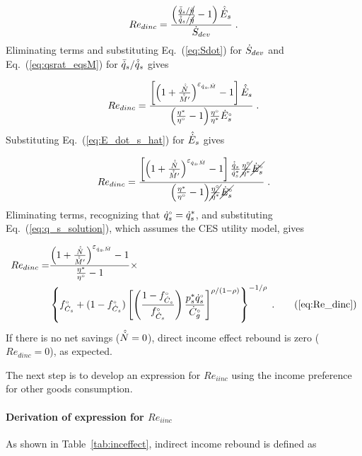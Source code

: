 \begin{equation}
  Re_{dinc} = \frac{\left( \frac{\bar{\dot{q}}_s / \cancel{\bar{\eta}}}{\hat{\dot{q}}_s / \cancel{\hat{\eta}}} - 1  \right) \hat{\dot{E}}_s}
              {\dot{S}_{dev}} \; .
\end{equation}
%
Eliminating terms and substituting Eq.~(\ref{eq:Sdot}) for $\dot{S}_{dev}$ and
Eq.~(\ref{eq:qsrat_eqsM}) for $\bar{\dot{q}}_s / \hat{\dot{q}}_s$ gives

\begin{equation}
  Re_{dinc} = \frac{\left[ \left( 1 + \frac{\hat{\dot{N}}}{\hat{\dot{M}}^\prime} \right) ^{\varepsilon_{\dot{q}_s\!,\dot{M}}} - 1  \right] \hat{\dot{E}}_s}
              {\left( \frac{{\eta}^*}{{}{\eta}^{\scriptscriptstyle \circ}} - 1 \right)\! \frac{{}{\eta}^{\scriptscriptstyle \circ}}{{\eta}^*} {}{\dot{E}}^{\scriptscriptstyle \circ}_s} \; .
\end{equation}
%
Substituting Eq.~(\ref{eq:E_dot_s_hat}) for $\hat{\dot{E}}_s$ gives

\begin{equation}
  Re_{dinc} = \frac{\left[ \left( 1 + \frac{\hat{\dot{N}}}{\hat{\dot{M}}^\prime} \right) ^{\varepsilon_{\dot{q}_s\!,\dot{M}}} - 1  \right]
                  \frac{\hat{\dot{q}}_s}{{\dot{q}}^*_s}
                \cancel{\frac{{}{\eta}^{\scriptscriptstyle \circ}}{{\eta}^*}}
                \cancel{{}{\dot{E}}^{\scriptscriptstyle \circ}_s}}
              {\left( \frac{{\eta}^*}{{}{\eta}^{\scriptscriptstyle \circ}} - 1 \right)\!
                  \cancel{\frac{{}{\eta}^{\scriptscriptstyle \circ}}{{\eta}^*}} \cancel{{}{\dot{E}}^{\scriptscriptstyle \circ}_s}} \; .
\end{equation}
%
Eliminating terms, recognizing that
${}{\dot{q}}^{\scriptscriptstyle \circ}_s = {\dot{q}}^*_s$, and substituting Eq.~(\ref{eq:q_s_solution}),
which assumes the CES utility model,
gives

\begin{align}
  Re_{dinc} = &\Redinceqnexact{} \; . \tag{\ref{eq:Re_dinc}}
\end{align}
%
If there is no net savings ($\hat{\dot{N}} = 0$),
direct income effect rebound is zero ($Re_{dinc} = 0$), as expected.

The next step is to develop an expression for $Re_{iinc}$
using the income preference for other goods consumption.


\paragraph{Derivation of expression for $Re_{iinc}$}
\label{sec:Re_iinc}

As shown in Table~\ref{tab:inceffect}, indirect income rebound is defined as

